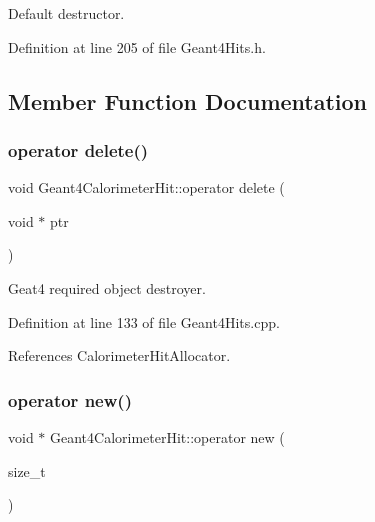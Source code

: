 Default destructor. 



Definition at line 205 of file Geant4\+Hits.\+h.



\subsection{Member Function Documentation}
\hypertarget{class_d_d4hep_1_1_simulation_1_1_geant4_calorimeter_hit_a974038503b2e2fa0d988b802ad5c29e2}{}\label{class_d_d4hep_1_1_simulation_1_1_geant4_calorimeter_hit_a974038503b2e2fa0d988b802ad5c29e2} 
\subsubsection{\texorpdfstring{operator delete()}{operator delete()}}
{\footnotesize\ttfamily void Geant4\+Calorimeter\+Hit\+::operator delete (\begin{DoxyParamCaption}\item[{void $\ast$}]{ptr }\end{DoxyParamCaption})}



Geat4 required object destroyer. 



Definition at line 133 of file Geant4\+Hits.\+cpp.



References Calorimeter\+Hit\+Allocator.

\hypertarget{class_d_d4hep_1_1_simulation_1_1_geant4_calorimeter_hit_a2f0811576b3d642d15805d87a096f598}{}\label{class_d_d4hep_1_1_simulation_1_1_geant4_calorimeter_hit_a2f0811576b3d642d15805d87a096f598} 
\subsubsection{\texorpdfstring{operator new()}{operator new()}}
{\footnotesize\ttfamily void $\ast$ Geant4\+Calorimeter\+Hit\+::operator new (\begin{DoxyParamCaption}\item[{size\+\_\+t}]{ }\end{DoxyParamCaption})}



